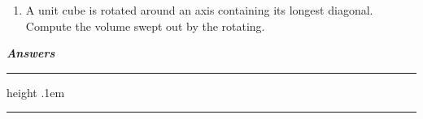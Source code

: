 \documentclass[12pt,a4paper,twoside]{book}
\newcommand{\answer}[1]{\textit{\textbf{Answers}} \vhrulefill{.1em}
\ \\[2pt]
#1
\vspace{5pt}\hrule height .1em }
\def\vhrulefill#1{\leaders\hrule height #1\hfill}
\begin{document}
\begin{enumerate}
	
	
	
	
	
	
	
	
	\item A unit cube is rotated around an axis containing its longest diagonal. Compute the volume swept out by the rotating.
	\end{enumerate}

\answer{


}
\end{document}
